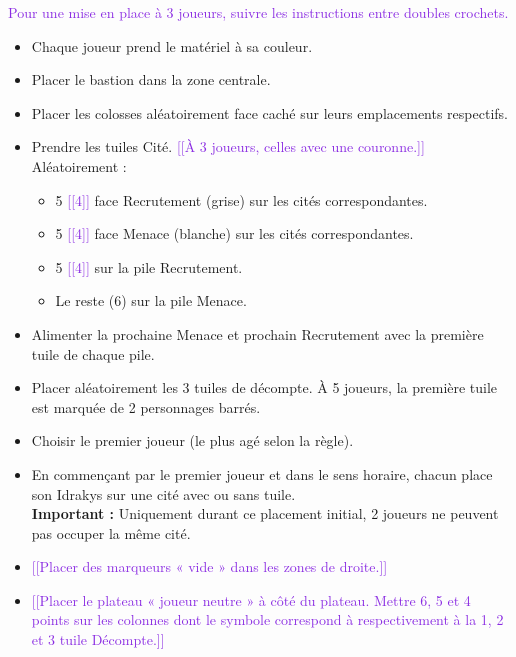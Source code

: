 \documentclass[10pt, a4paper]{article}	%
\begin{document}
\begin{multicols}{3}
\textcolor{BlueViolet}{Pour une mise en place à 3 joueurs, suivre les instructions entre doubles crochets.}
\begin{itemize}
    \item Chaque joueur prend le matériel à sa couleur.
    \item Placer le bastion dans la zone centrale.
    \item Placer les colosses aléatoirement face caché sur leurs emplacements respectifs.
    \item Prendre les tuiles Cité. \textcolor{BlueViolet}{[[À 3 joueurs, celles avec une couronne.]]} Aléatoirement :
    \begin{itemize}
        \item 5 \textcolor{BlueViolet}{[[4]]} face Recrutement (grise) sur les cités correspondantes.
        \item 5 \textcolor{BlueViolet}{[[4]]} face Menace (blanche) sur les cités correspondantes.
        \item 5 \textcolor{BlueViolet}{[[4]]} sur la pile Recrutement.
        \item Le reste (6) sur la pile Menace.
    \end{itemize}
    \item Alimenter la prochaine Menace et prochain Recrutement avec la première tuile de chaque pile.
    \item Placer aléatoirement les 3 tuiles de décompte. À 5 joueurs, la première tuile est marquée de 2 personnages barrés.
    \item Choisir le premier joueur (le plus agé selon la règle).
    \item En commençant par le premier joueur et dans le sens horaire, chacun place son Idrakys sur une cité avec ou sans tuile.\\
            \textbf{Important :} Uniquement durant ce placement initial, 2 joueurs ne peuvent pas occuper la même cité.
    \item \textcolor{BlueViolet}{[[Placer des marqueurs « vide » dans les zones de droite.]]}
    \item \textcolor{BlueViolet}{[[Placer le plateau « joueur neutre » à côté du plateau. Mettre 6, 5 et 4 points sur les colonnes dont le symbole correspond à respectivement à la 1\iere{}, 2\ieme{} et 3\ieme{} tuile Décompte.]]}
\end{itemize}



\end{multicols}
\end{document}
